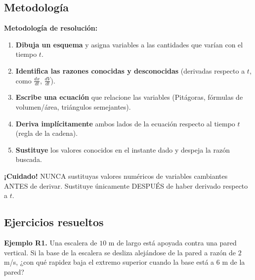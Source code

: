 \documentclass[12pt, a4paper]{article}
\begin{document}
\subsection{Metodología}

\begin{cuadroteoria}
  \textbf{Metodología de resolución:}
  \begin{enumerate}[leftmargin=*]
    \item \textbf{Dibuja un esquema} y asigna variables a las cantidades que varían con el tiempo $t$.
    \item \textbf{Identifica las razones conocidas y desconocidas} (derivadas respecto a $t$, como $\frac{dx}{dt}$, $\frac{dV}{dt}$).
    \item \textbf{Escribe una ecuación} que relacione las variables (Pitágoras, fórmulas de volumen/área, triángulos semejantes).
    \item \textbf{Deriva implícitamente} ambos lados de la ecuación respecto al tiempo $t$ (regla de la cadena).
    \item \textbf{Sustituye} los valores conocidos en el instante dado y despeja la razón buscada.
  \end{enumerate}
\end{cuadroteoria}

\begin{cuadroadvertencia}
  \textbf{¡Cuidado!} NUNCA sustituyas valores numéricos de variables cambiantes ANTES de derivar. Sustituye únicamente DESPUÉS de haber derivado respecto a $t$.
\end{cuadroadvertencia}

\subsection{Ejercicios resueltos}

\textbf{Ejemplo R1.} Una escalera de $10$ m de largo está apoyada contra una pared vertical. Si la base de la escalera se desliza alejándose de la pared a razón de $2$ m/s, ¿con qué rapidez baja el extremo superior cuando la base está a $6$ m de la pared?
\end{document}
